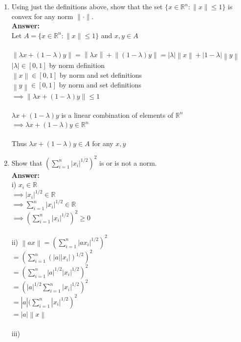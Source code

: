 \documentclass{article}
\newcommand{\field}[1]{\mathbb{#1}}
\newcommand{\1}{\mathbf{1}}
\newcommand{\R}{\field{R}} %
\newcommand{\norm}[1]{\left\|#1\right\|}
\begin{document}
\begin{enumerate}
	\item Using just the definitions above, show that the set $\{ x \in \R^n : \|x\| \leq 1\}$ is convex for any norm $\| \cdot \|$.\\
	\textbf{Answer:} \\
	Let $A=\{ x \in \R^n : \|x\| \leq 1\}$ and $x,y\in A$\\
	\\
	$\norm{\lambda x+(1-\lambda)y}=\norm{\lambda x}+\norm{(1-\lambda)y}=|\lambda|\norm{x}+|1-\lambda|\norm{y}$\\
	$|\lambda|\in[0,1]$ by norm definition\\
	$\norm{x}\in[0,1]$ by norm and set definitions\\
	$\norm{y}\in[0,1]$ by norm and set definitions\\
	$\implies \norm{\lambda x+(1-\lambda)y}\leq1$\\
	\\
	$\lambda x+(1-\lambda)y$ is a linear combination of elements of $\R^n$\\
	$\implies \lambda x+(1-\lambda)y\in \R^n$\\
	\\
	Thus $\lambda x+(1-\lambda)y \in A$ for any $x,y$
	
	\item Show that $\left(\sum_{i=1}^n |x_i|^{1/2}\right)^2$ is or is not a norm.\\
	\textbf{Answer:} \\
	i) $x_i\in \R$\\
	$\implies |x_i|^{1/2}\in\R $\\
	$\implies \sum_{i=1}^n|x_i|^{1/2}\in\R $\\
	$\implies \left(\sum_{i=1}^n |x_i|^{1/2}\right)^2\geq0 $\\
	\\
	ii) $\norm{a x}=\left(\sum_{i=1}^n |a x_i|^{1/2}\right)^2$\\
	$=\left(\sum_{i=1}^n (|a| |x_i|)^{1/2}\right)^2$\\
	$=\left(\sum_{i=1}^n |a|^{1/2} |x_i|^{1/2}\right)^2$\\
	$=\left(|a|^{1/2}\sum_{i=1}^n  |x_i|^{1/2}\right)^2$\\
	$=\left|a|(\sum_{i=1}^n  |x_i|^{1/2}\right)^2$\\
	$=|a|\norm{x}$\\
	\\
	iii)
\end{enumerate} 
\end{document}
